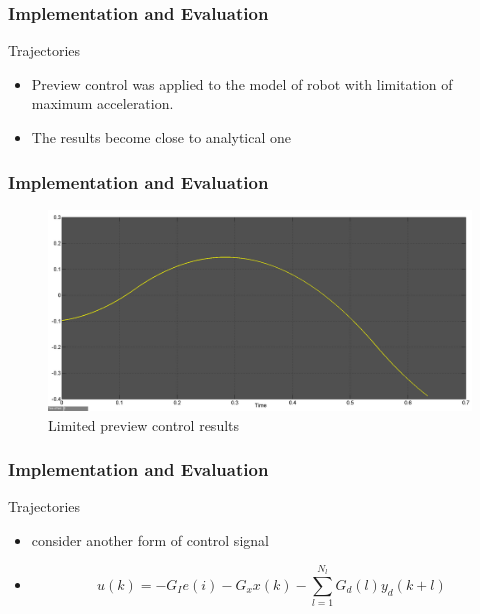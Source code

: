 \documentclass{beamer}
\begin{document}

	\begin{frame}
		\frametitle{Implementation and Evaluation}
		\begin{block}{Trajectories}
			\begin{itemize}
				\item
					Preview control was applied to the model of robot with limitation of maximum acceleration.
				\item
					The results become close to analytical one
			\end{itemize}
		\end{block}
	\end{frame}
	

	\begin{frame}
		\frametitle{Implementation and Evaluation}
		\begin{figure}[h!]
			\centering
			\includegraphics[width=0.8\linewidth]{presentation_images/29}
			\caption{Limited preview control results}
		\end{figure}
	\end{frame}
	

	\begin{frame}
		\frametitle{Implementation and Evaluation}
		\begin{block}{Trajectories}
			\begin{itemize}
				\item
					\cite{choi2006fuzzy} consider another form of control signal
				\item
					\begin{equation}
						u(k) = -G_I e(i) - G_xx(k) - \sum^{N_l}_{l=1}G_d(l)y_d(k+l)
					\end{equation}
			\end{itemize}
		\end{block}
	\end{frame}
	
\end{document}
